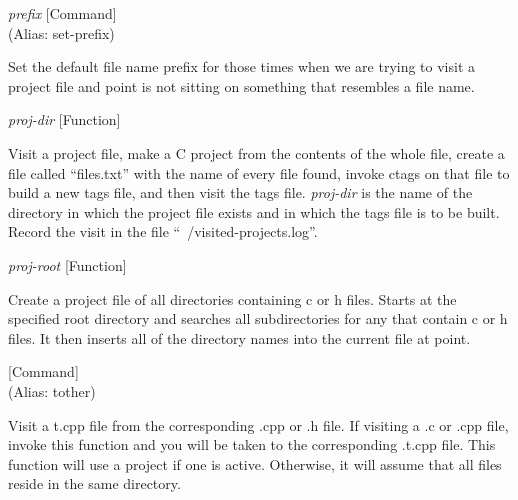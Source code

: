 \vspace{1em}
\noindent
{}
\usebox{\funcname}\emph{prefix}
 \hfill [Command]\\%
 (Alias: set-prefix)

\begin{doc-string}
Set the default file name prefix for those times when we are trying to visit
a project file and point is not sitting on something that resembles a file name.
\end{doc-string}

\vspace{1em}
\noindent
{}
\usebox{\funcname}\emph{proj-dir}
 \hfill [Function]

\begin{doc-string}
Visit a project file, make a C project from the contents of the whole file,
create a file called ``files.txt'' with the name of every file found, invoke
ctags on that file to build a new tags file, and then visit the tags file.
\emph{proj-dir} is the name of the directory in which the project file exists and in
which the tags file is to be built.
Record the visit in the file ``~/visited-projects.log''.
\end{doc-string}

\vspace{1em}
\noindent
{}
\usebox{\funcname}\emph{proj-root}
 \hfill [Function]

\begin{doc-string}
Create a project file of all directories containing c or h files.
Starts at the specified root directory and searches all subdirectories for
any that contain c or h files.  It then inserts all of the directory names
into the current file at point.
\end{doc-string}

\vspace{1em}
\noindent
{}
\usebox{\funcname}
 \hfill [Command]\\%
 (Alias: tother)

\begin{doc-string}
Visit a t.cpp file from the corresponding .cpp or .h file.  If visiting a .c
or .cpp file, invoke this function and you will be taken to the corresponding
.t.cpp file.  This function will use a project if one is active.  Otherwise, it
will assume that all files reside in the same directory.
\end{doc-string}

